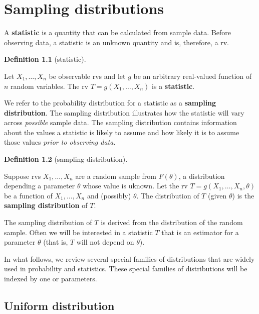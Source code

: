 \documentclass[
  a4paper,
  oneside]{book}
\theoremstyle{definition}
\newtheorem{definition}{Definition}[chapter]
\theoremstyle{definition}
\theoremstyle{definition}
\theoremstyle{plain}
\theoremstyle{remark}
\begin{document}
\chapter{Sampling distributions}\label{sec-sampling-distributions}

A \textbf{statistic} is a quantity that can be calculated from sample
data. Before observing data, a statistic is an unknown quantity and is,
therefore, a rv.

\begin{definition}[statistic]\protect\hypertarget{def-statistic}{}\label{def-statistic}

Let \(X_1, \dots, X_n\) be observable rvs and let \(g\) be an arbitrary
real-valued function of \(n\) random variables. The rv
\(T = g(X_1, \dots, X_n)\) is a \textbf{statistic}.

\end{definition}

We refer to the probability distribution for a statistic as a
\textbf{sampling distribution}. The sampling distribution illustrates
how the statistic will vary across \emph{possible} sample data. The
sampling distribution contains information about the values a statistic
is likely to assume and how likely it is to assume those values
\emph{prior to observing data}.

\begin{definition}[sampling
distribution]\protect\hypertarget{def-sampling-dist}{}\label{def-sampling-dist}

Suppose rvs \(X_1, \dots, X_n\) are a random sample from \(F(\theta)\),
a distribution depending a parameter \(\theta\) whose value is uknown.
Let the rv \(T = g(X_1, \dots, X_n, \theta)\) be a function of
\(X_1, \dots, X_n\) and (possibly) \(\theta\). The distribution of \(T\)
(given \(\theta\)) is the \textbf{sampling distribution} of \(T\).

\end{definition}

The sampling distribution of \(T\) is derived from the distribution of
the random sample. Often we will be interested in a statistic \(T\) that
is an estimator for a parameter \(\theta\) (that is, \(T\) will not
depend on \(\theta\)).

In what follows, we review several special families of distributions
that are widely used in probability and statistics. These special
families of distributions will be indexed by one or parameters.

\section{Uniform distribution}\label{uniform-distribution}
\end{document}
